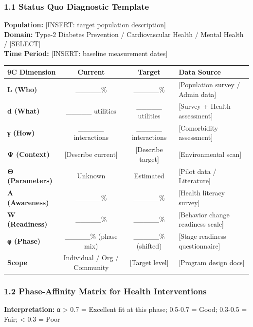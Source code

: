 \subsubsection*{1.1 Status Quo Diagnostic Template}

\textbf{Population:} [INSERT: target population description] \\
\textbf{Domain:} Type-2 Diabetes Prevention / Cardiovascular Health / Mental Health / [SELECT]\\
\textbf{Time Period:} [INSERT: baseline measurement dates]

\begin{center}
\begin{tabular}{@{}lccl@{}}
\toprule
\textbf{9C Dimension} & \textbf{Current} & \textbf{Target} & \textbf{Data Source} \\
\midrule
\textbf{L (Who)} & \_\_\_\_\_\% & \_\_\_\_\_\% & [Population survey / Admin data] \\
\textbf{d (What)} & \_\_\_\_\_ utilities & \_\_\_\_\_ utilities & [Survey + Health assessment] \\
\textbf{γ (How)} & \_\_\_\_\_ interactions & \_\_\_\_\_ interactions & [Comorbidity assessment] \\
\textbf{Ψ (Context)} & [Describe current] & [Describe target] & [Environmental scan] \\
\textbf{Θ (Parameters)} & Unknown & Estimated & [Pilot data / Literature] \\
\textbf{A (Awareness)} & \_\_\_\_\_\% & \_\_\_\_\_\% & [Health literacy survey] \\
\textbf{W (Readiness)} & \_\_\_\_\_\% & \_\_\_\_\_\% & [Behavior change readiness scale] \\
\textbf{φ (Phase)} & \_\_\_\_\_\% (phase mix) & \_\_\_\_\_\% (shifted) & [Stage readiness questionnaire] \\
\textbf{Scope} & Individual / Org / Community & [Target level] & [Program design docs] \\
\midrule
\end{tabular}
\end{center}

\subsubsection*{1.2 Phase-Affinity Matrix for Health Interventions}

\textbf{Interpretation:} α > 0.7 = Excellent fit at this phase; 0.5-0.7 = Good; 0.3-0.5 = Fair; < 0.3 = Poor

